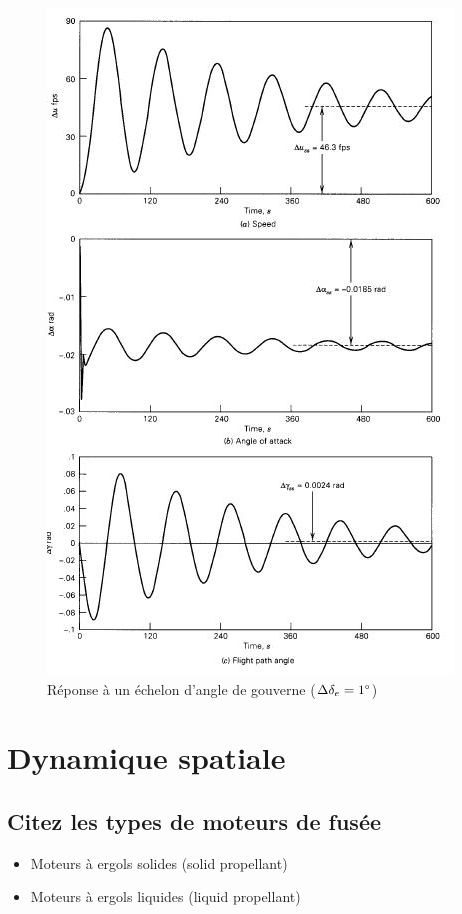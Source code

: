 \documentclass{report}
\begin{document}
\begin{figure}[h!]
    \centering
    \includegraphics[scale=0.6]{62.JPG}
    \caption{Réponse à un échelon d’angle de gouverne ($\Delta\delta_e=1\degree$)}
    \label{62}
\end{figure}




\chapter{Dynamique spatiale}

\section{Citez les types de moteurs de fusée}

\begin{itemize}
    \item Moteurs à ergols solides (solid propellant)
    \item Moteurs à ergols liquides (liquid propellant)
\end{itemize}
\end{document}
